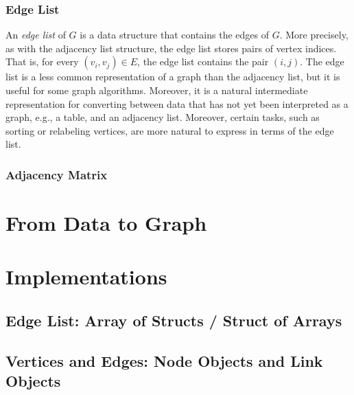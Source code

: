 \subsubsection{Edge List}

An \emph{edge list} of $G$ is a data structure that contains the edges of $G$.  More precisely, as
with the adjacency list structure, the edge list stores pairs of vertex indices.  That is, for
every $(v_i, v_j) \in E$, the edge list contains the pair $(i, j)$.  The edge list is
a less common representation of a graph than the adjacency list, but it is useful for
some graph algorithms.  Moreover, it is a natural intermediate representation for
converting between data that has not yet been interpreted as a graph, e.g., a table,
and an adjacency list.  Moreover, certain tasks, such as sorting or relabeling vertices, are
more natural to express in terms of the edge list.


\subsubsection{Adjacency Matrix}



\section{From Data to Graph}



\section{Implementations}


\subsection{Edge List: Array of Structs / Struct of Arrays}



\subsection{Vertices and Edges: Node Objects and Link Objects}

